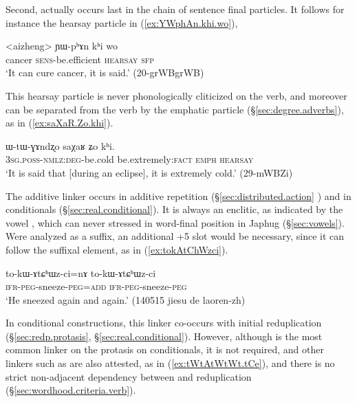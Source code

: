 Second,  actually occurs last in the chain of sentence final particles. It follows for instance the hearsay particle  in (\ref{ex:YWphAn.khi.wo}), 

\begin{exe}
\ex \label{ex:YWphAn.khi.wo}
\gll <aizheng> ɲɯ-pʰɤn kʰi wo\\
cancer \textsc{sens}-be.efficient \textsc{hearsay} \textsc{sfp} \\
\glt `It can cure cancer, it is said.' (20-grWBgrWB) 	
\end{exe}

This hearsay particle is never phonologically cliticized on the verb, and moreover can be separated from the verb by the emphatic particle  (§\ref{sec:degree.adverbs}), as in (\ref{ex:saXaR.Zo.khi}).

\begin{exe}
\ex \label{ex:saXaR.Zo.khi}
\gll ɯ-tɯ-ɣɤndʐo saχaʁ ʑo kʰi. \\
\textsc{3sg}.\textsc{poss}-\textsc{nmlz}:\textsc{deg}-be.cold be.extremely:\textsc{fact} \textsc{emph} \textsc{hearsay} \\
\glt `It is said that [during an eclipse], it is extremely cold.' (29-mWBZi) 	
\end{exe}

The additive linker  occurs in additive repetition (§\ref{sec:distributed.action} ) and in conditionals (§\ref{sec:real.conditional}). It is always an enclitic, as indicated by the vowel , which can never stressed in word-final position in Japhug (§\ref{sec:vowels}).  Were  analyzed as a suffix, an additional +5 slot would be necessary, since it can follow the  suffixal element, as in (\ref{ex:tokAtChWzci}).

\begin{exe}
\ex \label{ex:tokAtChWzci}
\gll to-kɯ-ɤtɕʰɯz-ci=nɤ to-kɯ-ɤtɕʰɯz-ci \\
\textsc{ifr}-\textsc{peg}-sneeze-\textsc{peg}=\textsc{add} \textsc{ifr}-\textsc{peg}-sneeze-\textsc{peg}  \\
\glt `He sneezed again and again.' (140515 jiesu de laoren-zh) 
\end{exe}

In conditional constructions, this linker co-occurs with initial reduplication (§\ref{sec:redp.protasis}, §\ref{sec:real.conditional}). However, although  is the most common linker on the protasis on conditionals, it is not required, and other linkers such as  are also attested, as in (\ref{ex:tWtAtWtWt.tCe}), and there is no strict non-adjacent dependency between  and reduplication (§\ref{sec:wordhood.criteria.verb}).

